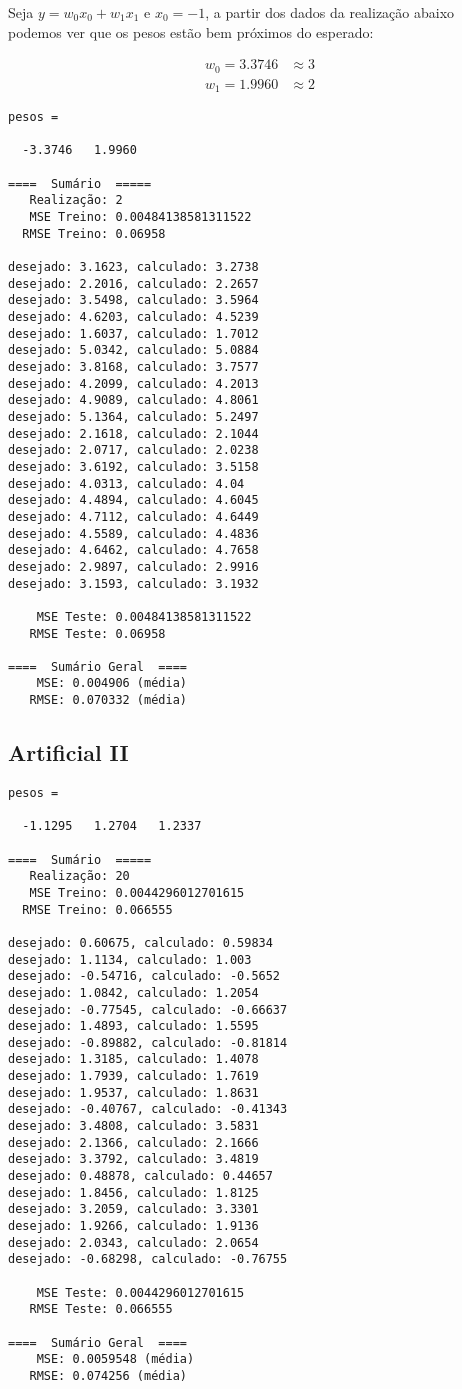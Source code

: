 Seja \(y = w_0 x_0 + w_1 x_1\) e \(x_0 = -1\), a partir dos dados da
realização abaixo podemos ver que os pesos estão bem próximos do
esperado:

\begin{align}
w_0 = 3.3746 &\approx 3 \\
w_1 = 1.9960 &\approx 2
\end{align}

\begin{verbatim}
pesos =

  -3.3746   1.9960

====  Sumário  =====
   Realização: 2
   MSE Treino: 0.00484138581311522
  RMSE Treino: 0.06958

desejado: 3.1623, calculado: 3.2738
desejado: 2.2016, calculado: 2.2657
desejado: 3.5498, calculado: 3.5964
desejado: 4.6203, calculado: 4.5239
desejado: 1.6037, calculado: 1.7012
desejado: 5.0342, calculado: 5.0884
desejado: 3.8168, calculado: 3.7577
desejado: 4.2099, calculado: 4.2013
desejado: 4.9089, calculado: 4.8061
desejado: 5.1364, calculado: 5.2497
desejado: 2.1618, calculado: 2.1044
desejado: 2.0717, calculado: 2.0238
desejado: 3.6192, calculado: 3.5158
desejado: 4.0313, calculado: 4.04
desejado: 4.4894, calculado: 4.6045
desejado: 4.7112, calculado: 4.6449
desejado: 4.5589, calculado: 4.4836
desejado: 4.6462, calculado: 4.7658
desejado: 2.9897, calculado: 2.9916
desejado: 3.1593, calculado: 3.1932

    MSE Teste: 0.00484138581311522
   RMSE Teste: 0.06958

====  Sumário Geral  ====
    MSE: 0.004906 (média)
   RMSE: 0.070332 (média)
\end{verbatim}

\subsection{Artificial II}

\begin{verbatim}
pesos =

  -1.1295   1.2704   1.2337

====  Sumário  =====
   Realização: 20
   MSE Treino: 0.0044296012701615
  RMSE Treino: 0.066555

desejado: 0.60675, calculado: 0.59834
desejado: 1.1134, calculado: 1.003
desejado: -0.54716, calculado: -0.5652
desejado: 1.0842, calculado: 1.2054
desejado: -0.77545, calculado: -0.66637
desejado: 1.4893, calculado: 1.5595
desejado: -0.89882, calculado: -0.81814
desejado: 1.3185, calculado: 1.4078
desejado: 1.7939, calculado: 1.7619
desejado: 1.9537, calculado: 1.8631
desejado: -0.40767, calculado: -0.41343
desejado: 3.4808, calculado: 3.5831
desejado: 2.1366, calculado: 2.1666
desejado: 3.3792, calculado: 3.4819
desejado: 0.48878, calculado: 0.44657
desejado: 1.8456, calculado: 1.8125
desejado: 3.2059, calculado: 3.3301
desejado: 1.9266, calculado: 1.9136
desejado: 2.0343, calculado: 2.0654
desejado: -0.68298, calculado: -0.76755

    MSE Teste: 0.0044296012701615
   RMSE Teste: 0.066555

====  Sumário Geral  ====
    MSE: 0.0059548 (média)
   RMSE: 0.074256 (média)
\end{verbatim}

